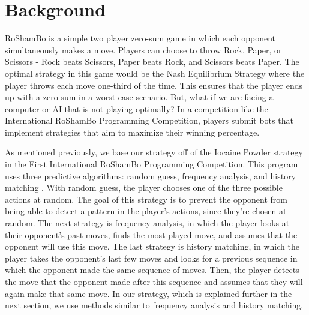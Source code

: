 
\section{Background}
\label{sec:background}

	RoShamBo is a simple two player zero-sum game in which each opponent simultaneously makes a move. Players can choose to throw Rock, Paper, or Scissors - Rock beats Scissors, Paper beats Rock, and Scissors beats Paper. The optimal strategy in this game would be the Nash Equilibrium Strategy where the player throws each move one-third of the time. This ensures that the player ends up with a zero sum in a worst case scenario. But, what if we are facing a computer or AI that is not playing optimally? In a competition like the International RoShamBo Programming Competition, players submit bots that implement strategies that aim to maximize their winning percentage.

	As mentioned previously, we base our strategy off of the Iocaine Powder strategy in the First International RoShamBo Programming Competition. This program uses three predictive algorithms: random guess, frequency analysis, and history matching \cite{iocaine}. With random guess, the player chooses one of the three possible actions at random. The goal of this strategy is to prevent the opponent from being able to detect a pattern in the player's actions, since they're chosen at random. The next strategy is frequency analysis, in which the player looks at their opponent's past moves, finds the most-played move, and assumes that the opponent will use this move. The last strategy is history matching, in which the player takes the opponent's last few moves and looks for a previous sequence in which the opponent made the same sequence of moves. Then, the player detects the move that the opponent made after this sequence and assumes that they will again make that same move. In our strategy, which is explained further in the next section, we use methods similar to frequency analysis and history matching.




